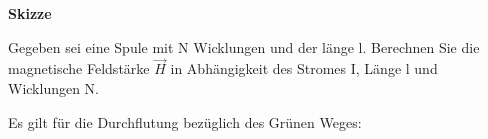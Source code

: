 	\textbf{Skizze}
	\begin{center}
	\end{center}
	\iend

	\beginbsp
	Gegeben sei eine Spule mit N Wicklungen und der länge l. Berechnen Sie die magnetische Feldstärke $\vec{H}$ in Abhängigkeit des Stromes I, Länge l und Wicklungen N.
	\iend

	\beginbsp
	Es gilt für die Durchflutung bezüglich des Grünen Weges:

		\begin{center}
		\end{center}





